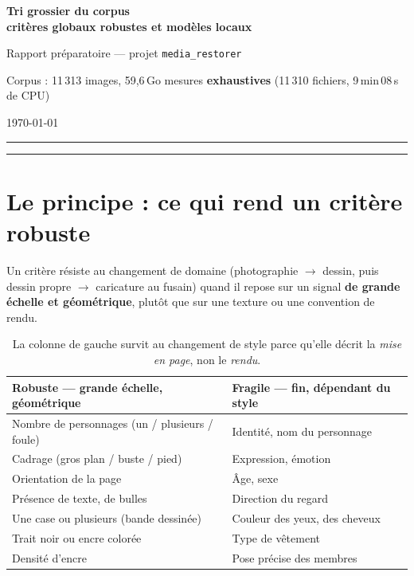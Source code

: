 \documentclass[11pt,a4paper]{article}
\newcommand{\alerte}[1]{\textcolor{alerte}{\textbf{#1}}}
\newcommand{\bon}[1]{\textcolor{vert}{\textbf{#1}}}
\begin{document}
\begin{center}
  {\LARGE\bfseries\color{accent} Tri grossier du corpus\\[2pt]
   critères globaux robustes et modèles locaux\par}
  \vspace{6pt}
  {\large Rapport préparatoire — projet \texttt{media\_restorer}\par}
  \vspace{4pt}
  {\small Corpus : 11\,313 images, 59,6\,Go \textbullet{} mesures
   \textbf{exhaustives} (11\,310 fichiers, 9\,min\,08\,s de CPU)\par}
  {\small \today\par}
\end{center}

\vspace{4pt}\hrule\vspace{10pt}
\tableofcontents
\vspace{10pt}\hrule

\section{Le principe : ce qui rend un critère robuste}

Un critère résiste au changement de domaine (photographie $\rightarrow$ dessin,
puis dessin propre $\rightarrow$ caricature au fusain) quand il repose sur un
signal \textbf{de grande échelle et géométrique}, plutôt que sur une texture ou
une convention de rendu.

\begin{table}[h]
\centering\small
\begin{tabularx}{\textwidth}{YY}
\toprule
\bon{Robuste} — grande échelle, géométrique &
\alerte{Fragile} — fin, dépendant du style \\
\midrule
Nombre de personnages (un / plusieurs / foule) & Identité, nom du personnage \\
Cadrage (gros plan / buste / pied) & Expression, émotion \\
Orientation de la page & Âge, sexe \\
Présence de texte, de bulles & Direction du regard \\
Une case ou plusieurs (bande dessinée) & Couleur des yeux, des cheveux \\
Trait noir ou encre colorée & Type de vêtement \\
Densité d'encre & Pose précise des membres \\
\bottomrule
\end{tabularx}
\caption{La colonne de gauche survit au changement de style parce qu'elle décrit
la \emph{mise en page}, non le \emph{rendu}.}
\end{table}
\end{document}
